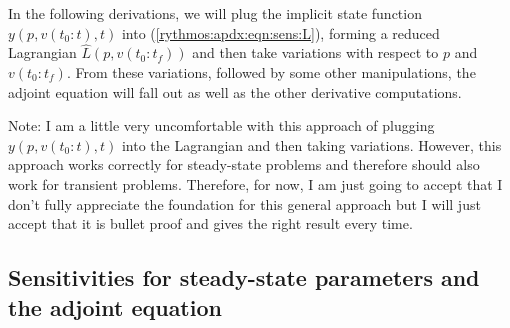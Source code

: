 \documentclass[pdf,ps2pdf,11pt]{SANDreport}
\begin{document}
In the following derivations, we will plug the implicit state function
$y(p,v(t_0:t),t)$ into (\ref{rythmos:apdx:eqn:sens:L}), forming a reduced
Lagrangian $\hat{L}(p,v(t_0:t_f))$ and then take variations with
respect to $p$ and $v(t_0:t_f)$.  From these variations, followed by
some other manipulations, the adjoint equation will fall out as well
as the other derivative computations.

Note: I am a little very uncomfortable with this approach of plugging
$y(p,v(t_0:t),t)$ into the Lagrangian and then taking variations.  However,
this approach works correctly for steady-state problems and therefore should
also work for transient problems.  Therefore, for now, I am just going to
accept that I don't fully appreciate the foundation for this general approach
but I will just accept that it is bullet proof and gives the right result
every time.

\subsection{Sensitivities for steady-state parameters and the adjoint equation}
\end{document}
